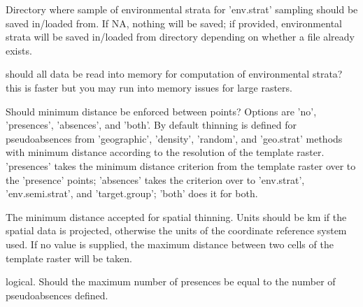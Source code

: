 \documentclass[a4paper]{book}
\begin{document}
\begin{Arguments}
\begin{ldescription}
\item[\code{env.strat\_path}] Directory where sample of environmental strata for
'env.strat' sampling should be saved in/loaded from. If NA, nothing will be
saved; if provided, environmental strata will be saved in/loaded from
directory depending on whether a file already exists.

\item[\code{rAll}] should all data be read into memory for computation of environmental
strata? this is faster but you may run into memory issues for large rasters.

\item[\code{force\_spat\_thin}] Should minimum distance be enforced between points? Options
are 'no', 'presences', 'absences', and 'both'. By default thinning is defined for
pseudoabsences from 'geographic', 'density', 'random', and 'geo.strat' methods
with minimum distance according to the resolution of the template raster.
'presences' takes the minimum distance criterion from the template raster over
to the 'presence' points; 'absences' takes the criterion over to 'env.strat',
'env.semi.strat', and 'target.group'; 'both' does it for both.

\item[\code{limdist}] The minimum distance accepted for spatial thinning. Units
should be km if the spatial data is projected, otherwise the units of the
coordinate reference system used. If no value is supplied, the maximum
distance between two cells of the template raster will be taken.

\item[\code{set\_max\_npres\_to\_nabs}] logical. Should the maximum number of presences be
equal to the number of pseudoabsences defined.
\end{ldescription}
\end{Arguments}
%
\end{document}
